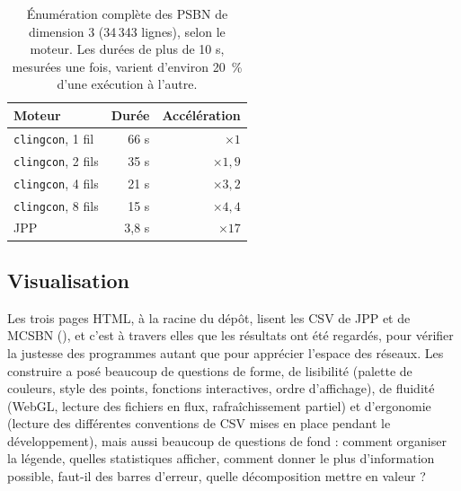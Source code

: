 \documentclass[12pt, a4paper]{article}
\begin{document}
\begin{table}[htbp]
\centering
\small
\caption{Énumération complète des PSBN de dimension 3 (34\,343 lignes), selon le moteur. Les durées de plus de 10 s, mesurées une fois, varient d'environ 20~\% d'une exécution à l'autre.}
\label{tab:parallelisme}
\begin{tabular}{lrr}
\toprule
Moteur & Durée & Accélération \\
\midrule
\texttt{clingcon}, 1 fil & 66 s & $\times 1$ \\
\texttt{clingcon}, 2 fils & 35 s & $\times 1{,}9$ \\
\texttt{clingcon}, 4 fils & 21 s & $\times 3{,}2$ \\
\texttt{clingcon}, 8 fils & 15 s & $\times 4{,}4$ \\
JPP & 3,8 s & $\times 17$ \\
\bottomrule
\end{tabular}
\end{table}




\subsection{Visualisation}
\label{sec:observation}

Les trois pages HTML, à la racine du dépôt, lisent les CSV de JPP et de MCSBN (), et c'est à travers elles que les résultats ont été regardés, pour vérifier la justesse des programmes autant que pour apprécier l'espace des réseaux.
Les construire a posé beaucoup de questions de forme, de lisibilité (palette de couleurs, style des points, fonctions interactives, ordre d'affichage), de fluidité (WebGL, lecture des fichiers en flux, rafraîchissement partiel) et d'ergonomie (lecture des différentes conventions de CSV mises en place pendant le développement), mais aussi beaucoup de questions de fond : comment organiser la légende, quelles statistiques afficher, comment donner le plus d'information possible, faut-il des barres d'erreur, quelle décomposition mettre en valeur ?
\end{document}
